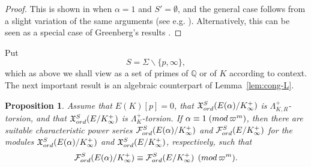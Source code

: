 \documentclass[a4paper,10pt]{amsart}
\numberwithin{equation}{section}
\numberwithin{equation}{section}
\theoremstyle{plain}
\theoremstyle{definition}
\theoremstyle{definition}
\theoremstyle{plain}
\newtheorem{prop}[thm]{Proposition}
\theoremstyle{plain}
\theoremstyle{plain}
\theoremstyle{plain}
\newcommand{\Q}{\mathbb{Q}}
\newcommand{\X}{\mathfrak{X}}
\DeclareMathOperator{\ch}{ch}
\newcommand{\Fcal}{\mathcal{F}}
\begin{document}
\begin{proof} 
This is shown in \cite[Prop.\,4.14]{greenberg-cetraro} when $\alpha=1$ and $S'=\emptyset$, and the general case follows from a slight variation of the same arguments (see e.g. \cite[Prop.\,2.3.3]{skinner-mult}). Alternatively, this can be seen as a special case of Greenberg's results \cite{greenberg-Sel}.
\end{proof}

Put
\[
S=\Sigma\smallsetminus\{p,\infty\},
\]
which as above we shall view as a set of primes of $\Q$ or of $K$ according to context. The next important result is an algebraic counterpart of Lemma~\ref{lem:cong-L}.

\begin{prop}\label{prop:cong-Sel}
Assume that $E(K)[p]=0$, that $\X_{\rm ord}^S(E(\alpha)/K_\infty^+)$ is $\Lambda^+_{K,R}$-torsion, and that
$\X_{\rm ord}^S(E/K_\infty^+)$ is $\Lambda_K^+$-torsion. 
If $\alpha\equiv 1\;({\rm mod}\,\varpi^m)$, then there are suitable characteristic power series $\Fcal_{\rm ord}^S(E(\alpha)/K_\infty^+)$ and $\Fcal_{\rm ord}^S(E/K_\infty^+)$ for the 
modules $\X_{\rm ord}^S(E(\alpha)/K_\infty^+)$ and $\X_{\rm ord}^S(E/K_\infty^+)$, respectively, such that 
\[
\Fcal_{\rm ord}^S(E(\alpha)/K_\infty^+)\equiv\Fcal_{\rm ord}^S(E/K_\infty^+)\;\,({\rm mod}\,\varpi^m).
\]
\end{prop}
\end{document}
